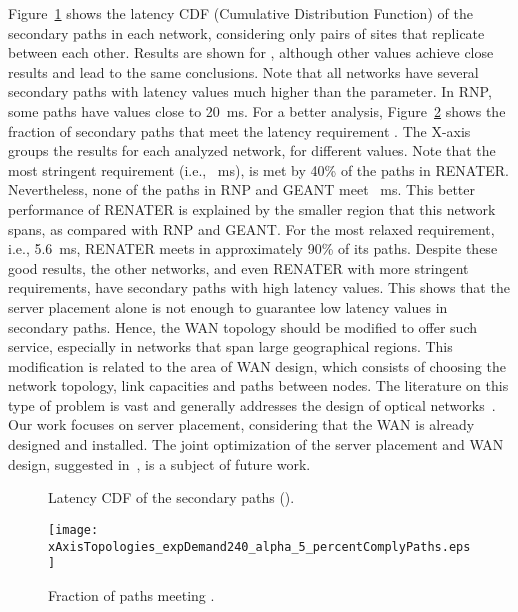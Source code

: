 \documentclass[preprint]{elsarticle}
\begin{document}
Figure~\ref{zeroRPOfig:redudantPaths} shows the latency CDF (Cumulative Distribution Function) of the secondary paths in each network, considering only pairs of sites that replicate between each other. Results are shown for , although other  values achieve close results and lead to the same conclusions. Note that all networks have several secondary paths with latency values much higher than the  parameter. In RNP, some paths have values close to 20~ms. For a better analysis, Figure~\ref{zeroRPOfig:percentComplyPaths} shows the fraction of secondary paths that meet the latency requirement . The X-axis groups the results for each analyzed network, for different  values. Note that the most stringent requirement (i.e., ~ms), is met by 40\% of the paths in RENATER. Nevertheless, none of the paths in RNP and GEANT meet ~ms. This better performance of RENATER is explained by the smaller region that this network spans, as compared with RNP and GEANT. For the most relaxed requirement, i.e., 5.6~ms, RENATER meets  in approximately 90\% of its paths. Despite these good results, the other networks, and even RENATER with more stringent requirements, have secondary paths with high latency values. This shows that the server placement alone is not enough to guarantee low latency values in secondary paths. Hence, the WAN topology should be modified to offer such service, especially in networks that span large geographical regions. This modification is related to the area of WAN design, which consists of choosing the network topology, link capacities and paths between nodes.
The literature on this type of problem is vast and generally addresses the design of optical networks~\cite{habib2013disaster}.
Our work focuses on server placement, considering that the WAN is already designed and installed. The joint optimization of the server placement and WAN design, suggested in~\cite{couto2014Network}, is a subject of future work.
\begin{figure}[ht!]
\centering
{}
\caption{Latency CDF of the secondary paths ().}
\label{zeroRPOfig:redudantPaths}
\end{figure}
\begin{figure}[ht!]
\centering
\texttt{[image: xAxisTopologies\_expDemand240\_alpha\_5\_percentComplyPaths.eps]}
\caption{Fraction of paths meeting .}
\label{zeroRPOfig:percentComplyPaths}
\end{figure} 
\end{document}
